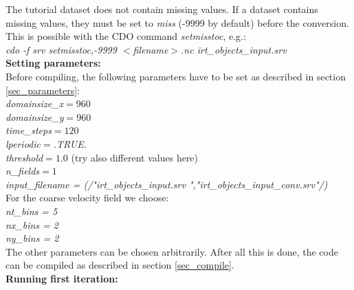 \documentclass[11pt]{article}
\begin{document}
The tutorial dataset does not contain missing values. If a dataset contains missing values, they must be set to {\it miss} (-9999 by default) before the conversion. This is possible with the CDO command {\it setmisstoc}, e.g.:\\
{\it cdo -f srv setmisstoc,-9999 $<$filename$>$.nc irt\_objects\_input.srv}\vspace{0.5cm}\\
{\bf Setting parameters:}\\
Before compiling, the following parameters have to be set as described in section \ref{sec_parameters}:\\
{\it domainsize\_x}$=960$\\
{\it domainsize\_y}$=960$\\
{\it time\_steps}$=120$\\
{\it lperiodic}$=${\it .TRUE.}\\
{\it threshold}$=1.0$ \hspace{0.5cm} (try also different values here)\\
{\it n\_fields}$=1$\\
{\it input\_filename = (/"irt\_objects\_input.srv     ","irt\_objects\_input\_conv.srv"/)}\\
For the coarse velocity field we choose:\\
{\it nt\_bins = 5}\\
{\it nx\_bins = 2}\\
{\it ny\_bins = 2}\\
The other parameters can be chosen arbitrarily. After all this is done, the code can be compiled as described in section \ref{sec_compile}.\vspace{0.5cm}\\
{\bf Running first iteration:}\\
\end{document}
